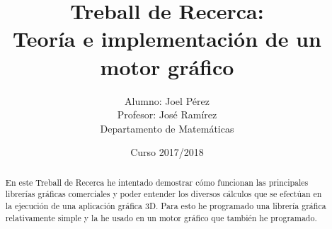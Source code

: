 \documentclass{report}
\title{Treball de Recerca:\\Teoría e implementación de un motor gráfico}
\date{Curso 2017/2018}
\author{Alumno: Joel Pérez\\Profesor: José Ramírez\\Departamento de Matemáticas}
\begin{document}
\lstset{language=C, basicstyle=\ttfamily}

\maketitle


\newpage


\begin{abstract}
  En este Treball de Recerca he intentado demostrar cómo funcionan las principales librerías gráficas comerciales y poder entender los diversos cálculos que se efectúan en la ejecución de una aplicación gráfica 3D. Para esto he programado una librería gráfica relativamente simple y la he usado en un motor gráfico que también he programado.
\end{abstract}

\tableofcontents




















\end{document}
